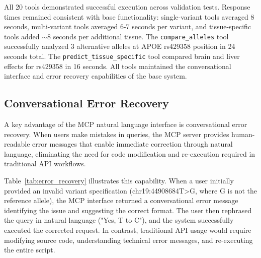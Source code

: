 \documentclass[11pt]{article}
\begin{document}
All 20 tools demonstrated successful execution across validation tests. Response times remained consistent with base functionality: single-variant tools averaged 8 seconds, multi-variant tools averaged 6-7 seconds per variant, and tissue-specific tools added $\sim$8 seconds per additional tissue. The \texttt{compare\_alleles} tool successfully analyzed 3 alternative alleles at APOE rs429358 position in 24 seconds total. The \texttt{predict\_tissue\_specific} tool compared brain and liver effects for rs429358 in 16 seconds. All tools maintained the conversational interface and error recovery capabilities of the base system.

\subsection{Conversational Error Recovery}

A key advantage of the MCP natural language interface is conversational error recovery. When users make mistakes in queries, the MCP server provides human-readable error messages that enable immediate correction through natural language, eliminating the need for code modification and re-execution required in traditional API workflows.

Table~\ref{tab:error_recovery} illustrates this capability. When a user initially provided an invalid variant specification (chr19:44908684T>G, where G is not the reference allele), the MCP interface returned a conversational error message identifying the issue and suggesting the correct format. The user then rephrased the query in natural language ("Yes, T to C"), and the system successfully executed the corrected request. In contrast, traditional API usage would require modifying source code, understanding technical error messages, and re-executing the entire script.
\end{document}
